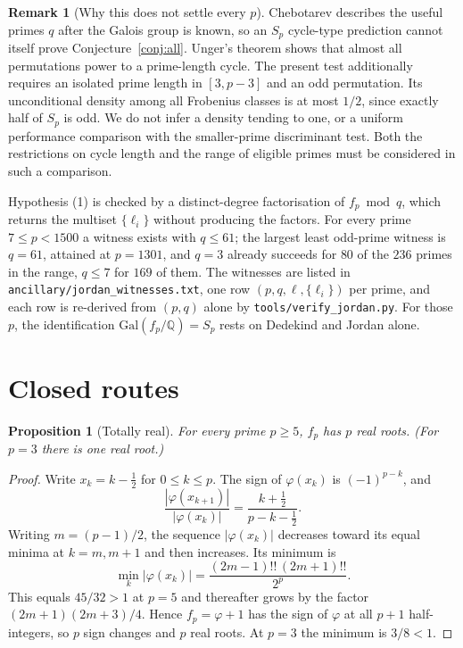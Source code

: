\documentclass[11pt,a4paper]{amsart}
\newcommand{\Q}{\mathbb{Q}}
\newcommand{\Gal}{\mathrm{Gal}}
\theoremstyle{plain}
\newtheorem{proposition}[theorem]{Proposition}
\theoremstyle{definition}
\newtheorem{remark}[theorem]{Remark}
\begin{document}
\begin{remark}[Why this does not settle every \(p\)]
\label{rem:jordan-open}
Chebotarev describes the useful primes \(q\) after the Galois group is known, so an \(S_p\) cycle-type prediction cannot itself prove Conjecture~\ref{conj:all}. Unger's theorem \cite[Thm.~2]{Unger} shows that almost all permutations power to a prime-length cycle. The present test additionally requires an isolated prime length in \([3,p-3]\) and an odd permutation. Its unconditional density among all Frobenius classes is at most \(1/2\), since exactly half of \(S_p\) is odd. We do not infer a density tending to one, or a uniform performance comparison with the smaller-prime discriminant test. Both the restrictions on cycle length and the range of eligible primes must be considered in such a comparison.
\end{remark}

Hypothesis (1) is checked by a distinct-degree factorisation of \(f_p\bmod q\), which returns the multiset \(\{\ell_i\}\) without producing the factors. For every prime \(7\le p<1500\) a witness exists with \(q\le61\); the largest least odd-prime witness is \(q=61\), attained at \(p=1301\), and \(q=3\) already succeeds for \(80\) of the \(236\) primes in the range, \(q\le7\) for \(169\) of them. The witnesses are listed in \texttt{ancillary/jordan\_witnesses.txt}, one row \((p,q,\ell,\{\ell_i\})\) per prime, and each row is re-derived from \((p,q)\) alone by \texttt{tools/verify\_jordan.py}. For those \(p\), the identification \(\Gal(f_p/\Q)=S_p\) rests on Dedekind and Jordan alone.

\section{Closed routes}
\label{sec:closed}

\begin{proposition}[Totally real]
\label{prop:real}
For every prime \(p\ge5\), \(f_p\) has \(p\) real roots. (For \(p=3\) there is one real root.)
\end{proposition}

\begin{proof}
Write \(x_k=k-\tfrac12\) for \(0\le k\le p\). The sign of \(\varphi(x_k)\) is \((-1)^{p-k}\), and
\[
\frac{|\varphi(x_{k+1})|}{|\varphi(x_k)|}=\frac{k+\tfrac12}{p-k-\tfrac12}.
\]
Writing \(m=(p-1)/2\), the sequence \(|\varphi(x_k)|\) decreases toward its equal minima at \(k=m,m+1\) and then increases. Its minimum is
\[
\min_k|\varphi(x_k)|=\frac{(2m-1)!!\,(2m+1)!!}{2^{p}}.
\]
This equals \(45/32>1\) at \(p=5\) and thereafter grows by the factor \((2m+1)(2m+3)/4\). Hence \(f_p=\varphi+1\) has the sign of \(\varphi\) at all \(p+1\) half-integers, so \(p\) sign changes and \(p\) real roots. At \(p=3\) the minimum is \(3/8<1\).
\end{proof}
\end{document}

